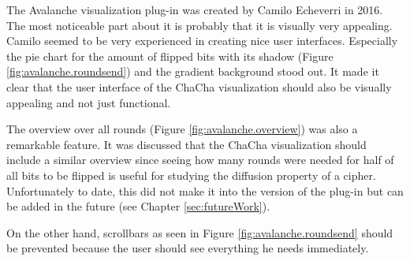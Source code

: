 The Avalanche visualization plug-in was created by Camilo Echeverri in 2016. The most noticeable part about it is probably that it is visually very appealing. Camilo seemed to be very experienced in creating nice user interfaces. Especially the pie chart for the amount of flipped bits with its shadow (Figure \ref{fig:avalanche.roundsend}) and the gradient background stood out. It made it clear that the user interface of the ChaCha visualization should also be visually appealing and not just functional.

The overview over all rounds (Figure \ref{fig:avalanche.overview}) was also a remarkable feature. It was discussed that the ChaCha visualization should include a similar overview since seeing how many rounds were needed for half of all bits to be flipped is useful for studying the diffusion property of a cipher. Unfortunately to date, this did not make it into the version of the plug-in but can be added in the future (see Chapter \ref{sec:futureWork}).

On the other hand, scrollbars as seen in Figure \ref{fig:avalanche.roundsend} should be prevented because the user should see everything he needs immediately.

